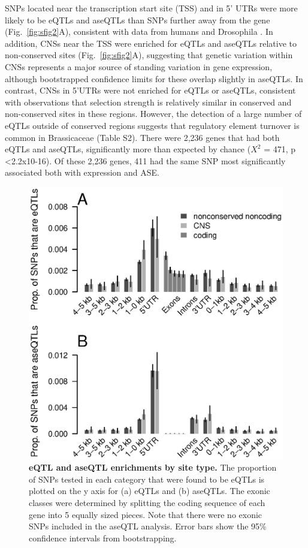 SNPs located near the transcription start site (TSS) and in 5’ UTRs were more likely to be eQTLs and aseQTLs than SNPs further away from the gene (Fig.~\ref{fig:sfig2}A), consistent with data from humans and Drosophila \citep{Massouras2012-wq,Pickrell2010-ci,Battle2014-ke}. In addition, CNSs near the TSS were enriched for eQTLs and aseQTLs relative to non-conserved sites (Fig.~\ref{fig:sfig2}A), suggesting that genetic variation within CNSs represents a major source of standing variation in gene expression, although bootstrapped confidence limits for these overlap slightly in aseQTLs. In contrast, CNSs in 5’UTRs were not enriched for eQTLs or aseQTLs, consistent with observations that selection strength is relatively similar in conserved and non-conserved sites in these regions\citep{Haudry2013-qe}. However, the detection of a large number of eQTLs outside of conserved regions suggests that regulatory element turnover is common in Brassicaceae (Table S2). There were 2,236 genes that had both eQTLs and aseQTLs, significantly more than expected by chance ($X^{2}$ = 471, p \textless 2.2x10-16). Of these 2,236 genes, 411 had the same SNP most significantly associated both with expression and ASE.

\begin{figure}[ht!]
      \centering
       \includegraphics[scale=0.8]{Ch3Fig2}
    \caption{\textbf{eQTL and aseQTL enrichments by site type.} The proportion of SNPs tested in each category that were found to be eQTLs is plotted on the y axis for (a) eQTLs and (b) aseQTLs. The exonic classes were determined by splitting the coding sequence of each gene into 5 equally sized pieces. Note that there were no exonic SNPs included in the aseQTL analysis. Error bars show the 95\% confidence intervals from bootstrapping.}
    \label{fig:3fig2}
\end{figure}

